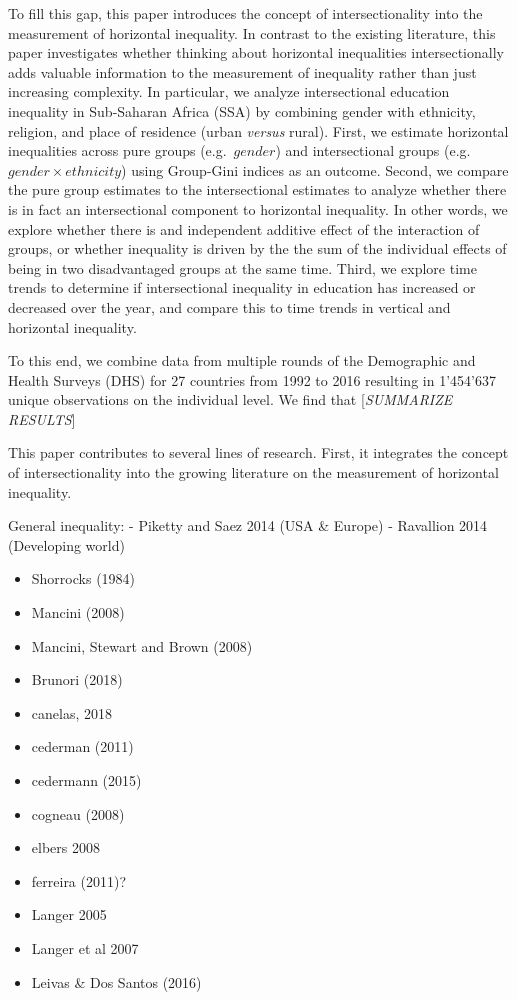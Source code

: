 \documentclass[
  11pt,
a4paper
]{article}
\providecommand{\tightlist}{%
  \setlength{\itemsep}{0pt}\setlength{\parskip}{0pt}}
\begin{document}
To fill this gap, this paper introduces the concept of intersectionality into the measurement of horizontal inequality. In contrast to the existing literature, this paper investigates whether thinking about horizontal inequalities intersectionally adds valuable information to the measurement of inequality rather than just increasing complexity. In particular, we analyze intersectional education inequality in Sub-Saharan Africa (SSA) by combining gender with ethnicity, religion, and place of residence (urban \emph{versus} rural). First, we estimate horizontal inequalities across pure groups (e.g.~\(gender\)) and intersectional groups (e.g.~\(gender\times ethnicity\)) using Group-Gini indices as an outcome. Second, we compare the pure group estimates to the intersectional estimates to analyze whether there is in fact an intersectional component to horizontal inequality. In other words, we explore whether there is and independent additive effect of the interaction of groups, or whether inequality is driven by the the sum of the individual effects of being in two disadvantaged groups at the same time. Third, we explore time trends to determine if intersectional inequality in education has increased or decreased over the year, and compare this to time trends in vertical and horizontal inequality.

To this end, we combine data from multiple rounds of the Demographic and Health Surveys (DHS) for 27 countries from 1992 to 2016 resulting in 1'454'637 unique observations on the individual level. We find that {[}\emph{SUMMARIZE RESULTS}{]}

This paper contributes to several lines of research. First, it integrates the concept of intersectionality into the growing literature on the measurement of horizontal inequality.

General inequality:
- Piketty and Saez 2014 (USA \& Europe)
- Ravallion 2014 (Developing world)

\begin{itemize}
\tightlist
\item
  Shorrocks (1984)
\item
  Mancini (2008)
\item
  Mancini, Stewart and Brown (2008)
\item
  Brunori (2018)
\item
  canelas, 2018
\item
  cederman (2011)
\item
  cedermann (2015)
\item
  cogneau (2008)
\item
  elbers 2008
\item
  ferreira (2011)?
\item
  Langer 2005
\item
  Langer et al 2007
\item
  Leivas \& Dos Santos (2016)
\end{itemize}
\end{document}
